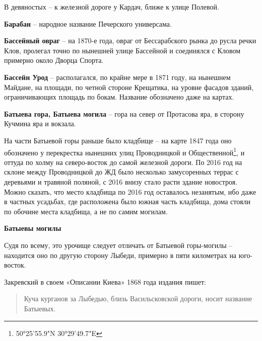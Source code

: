 В девяностых – к железной дороге у Кардач, ближе к улице Полевой.\\



\medskip


\textbf{Барабан} – народное название Печерского универсама.\\


\medskip


\textbf{Бассейный овраг} – на 1870-е года, овраг от Бессарабского рынка до русла речки Клов, пролегал точно по нынешней улице Бассейной и соединялся с Кловом примерно около Дворца Спорта.\\


\medskip


\textbf{Бассейн Урод} – располагался, по крайне мере в 1871 году, на нынешнем Майдане, на площади, по четной стороне Крещатика, на уровне фасадов зданий, ограничивающих площадь по бокам. Название обозначено даже на картах.\\


\medskip


\textbf{Батыева гора, Батыева могила} –  гора на север от Протасова яра, в сторону Кучмина яра и вокзала.

На части Батыевой горы раньше было кладбище – на карте 1847 года оно обозначено у перекрестка нынешних улиц Проводницкой и Общественной\footnote{50°25'55.9"N 30°29'49.7"E}, и оттуда по холму на северо-восток до самой железной дороги. По 2016 год на склоне между Проводницкой до ЖД было несколько замусоренных террас с деревьями и травяной поляной, с 2016 внизу стало расти здание новостроя. Можно сказать, что место кладбища по 2016 год оставалось незанятым, ибо даже в частных усадьбах, где расположена было южная часть кладбища, дома стояли по обочине места кладбища, а не по самим могилам.\\

\medskip


\textbf{Батыевы могилы}

Судя по всему, это урочище следует отличать от Батыевой горы-могилы – находится оно по другую сторону Лыбеди, примерно в пяти километрах на юго-восток.

Закревский в своем «Описании Киева» 1868 года издания пишет:

\begin{quotation}
Куча курганов за Лыбедью, близь Васильсковской дороги, носит название Батыевых.
\end{quotation}

